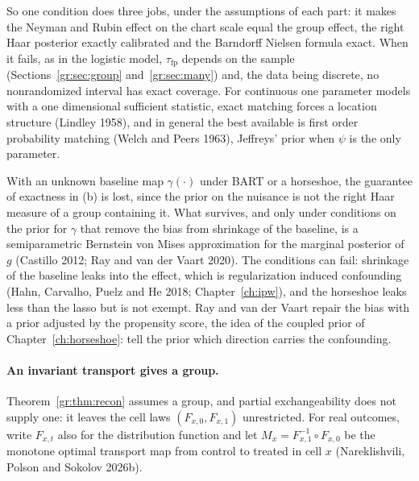 So one condition does three jobs, under the assumptions of each part: it makes the Neyman and Rubin effect on the chart scale equal the group effect, the right Haar posterior exactly calibrated and the Barndorff Nielsen formula exact. When it fails, as in the logistic model, $\tau_{\mathrm{fp}}$ depends on the sample (Sections~\ref{gr:sec:group} and~\ref{gr:sec:many}) and, the data being discrete, no nonrandomized interval has exact coverage. For continuous one parameter models with a one dimensional sufficient statistic, exact matching forces a location structure (Lindley 1958), and in general the best available is first order probability matching (Welch and Peers 1963), Jeffreys' prior when $\psi$ is the only parameter.

\begin{remark}\label{gr:rem:nuisance}
With an unknown baseline map $\gamma(\cdot)$ under BART or a horseshoe, the guarantee of exactness in (b) is lost, since the prior on the nuisance is not the right Haar measure of a group containing it. What survives, and only under conditions on the prior for $\gamma$ that remove the bias from shrinkage of the baseline, is a semiparametric Bernstein von Mises approximation for the marginal posterior of $g$ (Castillo 2012; Ray and van der Vaart 2020). The conditions can fail: shrinkage of the baseline leaks into the effect, which is regularization induced confounding (Hahn, Carvalho, Puelz and He 2018; Chapter~\ref{ch:ipw}), and the horseshoe leaks less than the lasso but is not exempt. Ray and van der Vaart repair the bias with a prior adjusted by the propensity score, the idea of the coupled prior of Chapter~\ref{ch:horseshoe}: tell the prior which direction carries the confounding.
\end{remark}

\paragraph{An invariant transport gives a group.} Theorem~\ref{gr:thm:recon} assumes a group, and partial exchangeability does not supply one: it leaves the cell laws $(F_{x,0},F_{x,1})$ unrestricted. For real outcomes, write $F_{x,t}$ also for the distribution function and let $M_x=F_{x,1}^{-1}\circ F_{x,0}$ be the monotone optimal transport map from control to treated in cell $x$ (Nareklishvili, Polson and Sokolov 2026b).

